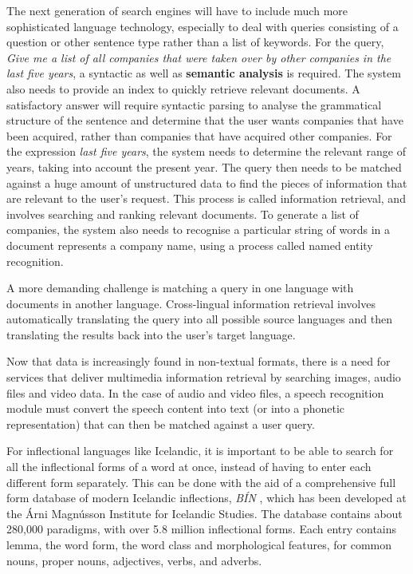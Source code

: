 \begin{multicols}{2}
The next generation of search engines will have to include much more sophisticated language technology, especially to deal with queries consisting of a question or other sentence type rather than a list of keywords. For the query, \textit{Give me a list of all companies that were taken over by other companies in the last five years}, a syntactic as well as \textbf{semantic analysis} is required. The system also needs to provide an index to quickly retrieve relevant documents. A satisfactory answer will require syntactic parsing to analyse the grammatical structure of the sentence and determine that the user wants companies that have been acquired, rather than companies that have acquired other companies. For the expression \textit{last five years}, the system needs to determine the relevant range of years, taking into account the present year. The query then needs to be matched against a huge amount of unstructured data to find the pieces of information that are relevant to the user’s request. This process is called information retrieval, and involves searching and ranking relevant documents. To generate a list of companies, the system also needs to recognise a particular string of words in a document represents a company name, using a process called named entity recognition.

A more demanding challenge is matching a query in one language with documents in another language. Cross-lingual information retrieval involves automatically translating the query into all possible source languages and then translating the results back into the user's target language.

Now that data is increasingly found in non-textual formats, there is a need for services that deliver multimedia information retrieval by searching images, audio files and video data. In the case of audio and video files, a speech recognition module must convert the speech content into text (or into a phonetic representation) that can then be matched against a user query.

For inflectional languages like Icelandic, it is important to be able to search for all the inflectional forms of a word at once, instead of having to enter each different form separately. This can be done with the aid of a comprehensive full form database of modern Icelandic inflections, \textit{BÍN} \cite{bin1}, which has been developed at the Árni Magnússon Institute for Icelandic Studies. The database contains about 280,000 paradigms, with over 5.8 million inflectional forms. Each entry contains lemma, the word form, the word class and morphological features, for common nouns, proper nouns, adjectives, verbs, and adverbs.


\end{multicols}
